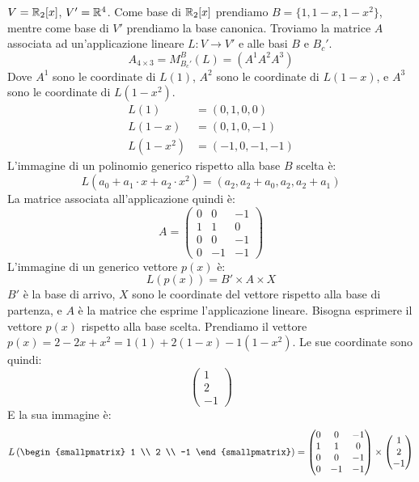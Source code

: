 \begin{exmp}
$V = \mathbb{R}_2[x]$, $V' = \mathbb{R}^4$. Come base di $\mathbb{R}_2[x]$ prendiamo $B = \{ 1, 1-x, 1-x^2\}$, mentre come base di $V'$ prendiamo la base canonica. Troviamo la matrice $A$ associata ad un'applicazione lineare $L : V \to V'$ e alle basi $B$ e $B_c'$.
\[
A_{4 \times 3} = M_{B_c'}^{B} (L) = (A^1 A^2 A^3)
\]
Dove $A^1$ sono le coordinate di $L(1)$, $A^2$ sono le coordinate di $L(1 - x)$, e $A^3$ sono le coordinate di $L(1 - x^2)$.
\begin{align*}
L(1) &= (0, 1, 0, 0) \\
L(1 - x) &= (0, 1, 0, -1) \\
L(1 - x^2) &= (-1, 0, -1, -1)
\end{align*}
L'immagine di un polinomio generico rispetto alla base $B$ scelta \`e:
\[
L(a_0 + a_1 \cdot x + a_2 \cdot x^2) = (a_2, a_2 + a_0, a_2, a_2 + a_1)
\]
La matrice associata all'applicazione quindi \`e:
\[
A = 
\begin{pmatrix}
0 & 0 & -1 \\
1 & 1 & 0 \\
0 & 0 & -1 \\
0 & -1 & -1
\end{pmatrix}
\]
L'immagine di un generico vettore $p(x)$ \`e:
\[
L \left( p(x) \right) = B' \times A \times X
\]
$B'$ \`e la base di arrivo, $X$ sono le coordinate del vettore rispetto alla base di partenza, e $A$ \`e la matrice che esprime l'applicazione lineare. Bisogna esprimere il vettore $p(x)$ rispetto alla base scelta. Prendiamo il vettore $p(x) = 2 - 2x + x^2 = 1(1) + 2(1-x) - 1(1 - x^2)$. Le sue coordinate sono quindi:
\[
\begin{pmatrix}
1 \\ 2 \\ -1
\end{pmatrix}
\]
E la sua immagine \`e:
\[
L \left( 
\begin{smallpmatrix}
1 \\ 2 \\ -1
\end{smallpmatrix}
\right) =
\begin{pmatrix}
0 & 0 & -1 \\
1 & 1 & 0 \\
0 & 0 & -1 \\
0 & -1 & -1
\end{pmatrix}
\times 
\begin{pmatrix}
1 \\ 2 \\ -1
\end{pmatrix}
\]
\end{exmp}

